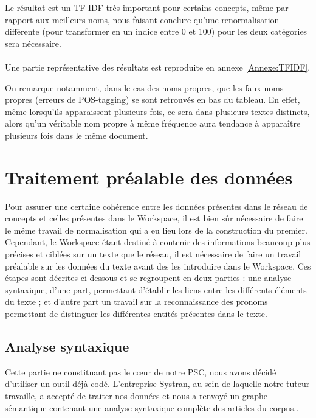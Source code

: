 \documentclass[a4paper, 12pt]{article}
\begin{document}
Le résultat est un TF-IDF très important pour certains concepts, même par rapport aux meilleurs noms, nous faisant conclure qu'une renormalisation différente (pour transformer en un indice entre 0 et 100) pour les deux catégories sera nécessaire.

\paragraph{}
Une partie représentative des résultats est reproduite en annexe \ref{Annexe:TFIDF}.

On remarque notamment, dans le cas des noms propres, que les faux noms propres (erreurs de POS-tagging) se sont retrouvés en bas du tableau. En effet, même lorsqu'ils apparaissent plusieurs fois, ce sera dans plusieurs textes distincts, alors qu'un véritable nom propre à même fréquence aura tendance à apparaître plusieurs fois dans le même document.


\section{Traitement préalable des données}

Pour assurer une certaine cohérence entre les données présentes dans le réseau de concepts et celles présentes dans le Workspace, il est bien sûr nécessaire de faire le même travail de normalisation qui a eu lieu lors de la construction du premier. Cependant, le Workspace étant destiné à contenir des informations beaucoup plus précises et ciblées sur un texte que le réseau, il est nécessaire de faire un travail préalable sur les données du texte avant des les introduire dans le Workspace. Ces étapes sont décrites ci-dessous et se regroupent en deux parties : une analyse syntaxique, d'une part, permettant d'établir les liens entre les différents éléments du texte ; et d'autre part un travail sur la reconnaissance des pronoms permettant de distinguer les différentes entités présentes dans le texte.

\subsection{Analyse syntaxique}

Cette partie ne constituant pas le c\oe{}ur de notre PSC, nous avons décidé d'utiliser un outil déjà codé. L'entreprise Systran, au sein de laquelle notre tuteur travaille, a accepté de traiter nos données et nous a renvoyé un graphe sémantique contenant une analyse syntaxique complète des articles du corpus..
\end{document}
